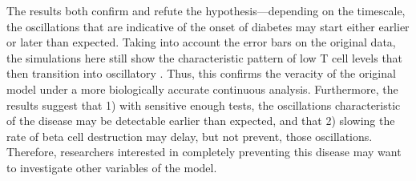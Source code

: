 The results both confirm and refute the hypothesis—depending on the
timescale, the oscillations that are indicative of the onset of diabetes may
start either earlier or later than expected. Taking into account the error
bars on the original data, the simulations here still show the
characteristic pattern of low T cell levels that then transition into
oscillatory . Thus, this confirms the veracity of the
original model under a more biologically accurate continuous
analysis. Furthermore, the results suggest that 1) with sensitive enough
tests, the oscillations characteristic of the disease may be detectable
earlier than expected, and that 2) slowing the rate of beta cell destruction
may delay, but not prevent, those oscillations. Therefore, researchers
interested in completely preventing this disease may want to investigate
other variables of the model.
